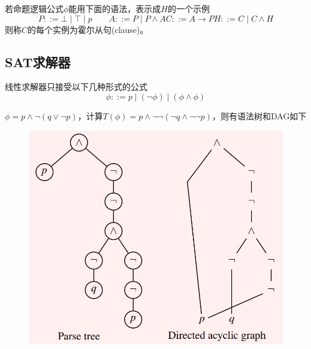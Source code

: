 \begin{definition}
若命题逻辑公式$\phi$能用下面的语法，表示成$H$的一个示例
\[P::=\bot\mid\top\mid p\qquad
A::=P\mid P\land A
C::=A\to P
H::=C\mid C\land H\]
则称$C$的每个实例为霍尔从句(clause)。
\end{definition}

\subsection{SAT求解器}
线性求解器只接受以下几种形式的公式
\[\phi::=p\mid(\lnot\phi)\mid(\phi\land\phi)\]
\begin{example}
$\phi=p\land\lnot(q\lor\lnot p)$，计算$T(\phi)=p\land\lnot\lnot(\lnot q\land\lnot\lnot p)$，则有语法树和DAG如下
\begin{figure}[H]
\centering
\includegraphics[width=0.6\linewidth]{fig/parse_tree_dag_eg.jpg}
\end{figure}
\end{example}